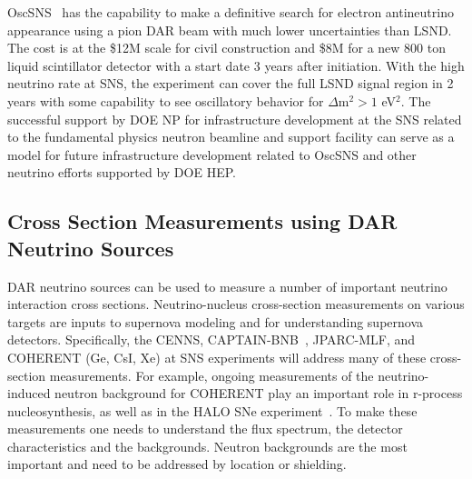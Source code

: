 
\noindent OscSNS~\cite{OscSNS} has the capability to make a definitive search for electron antineutrino appearance using a pion DAR beam with much lower uncertainties than LSND. The cost is at the \$12M scale for civil construction and \$8M for a new 800 ton liquid scintillator detector with a start date 3 years after initiation.  With the high neutrino rate at SNS, the experiment can cover the full LSND signal region in 2 years with some capability to see oscillatory behavior for $\Delta$m$^2 > 1$ eV$^2$.  The successful support by DOE NP for infrastructure development at the SNS related to the fundamental physics neutron beamline and support facility can serve as a model for future infrastructure development related to OscSNS and other neutrino efforts supported by DOE HEP.

\subsection{Cross Section Measurements using DAR Neutrino Sources}

\noindent DAR neutrino sources can be used to measure a number of important neutrino interaction cross sections.  Neutrino-nucleus cross-section measurements on various targets are inputs to supernova modeling and for understanding supernova detectors. Specifically, the CENNS, CAPTAIN-BNB~\cite{Captain}, JPARC-MLF, and COHERENT (Ge, CsI, Xe) at SNS experiments will address many of these cross-section measurements. For example, ongoing measurements of the neutrino-induced neutron background for COHERENT play an important role in r-process nucleosynthesis, as well as in the HALO SNe experiment~\cite{halo}. To make these measurements one needs to understand the flux spectrum, the detector characteristics and the backgrounds. Neutron backgrounds are the most important and need to be addressed by location or shielding.
